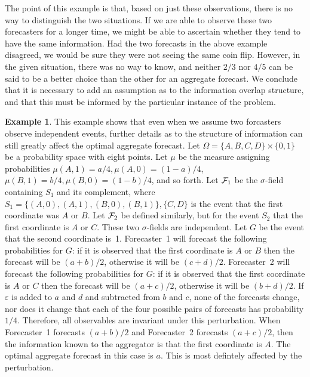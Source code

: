 \documentclass[11pt]{article}
\theoremstyle{definition}
\newtheorem{example}[theorem]{Example}
\theoremstyle{definition}
\def\F{{\cal F}}
\def\ee{\varepsilon}
\begin{document}
The point of this example is that, based on just these observations, 
there is no way to distinguish the two situations.  If we are able
to observe these two forecasters for a longer time, we might be
able to ascertain whether they tend to have the same information.
Had the two forecasts in the above example disagreed, we would be
sure they were not seeing the same coin flip.  However, in the given
situation, there was no way to know, and neither $2/3$ nor $4/5$ 
can be said to be a better choice than the other for an aggregate
forecast.  We conclude that it is necessary to add an assumption
as to the information overlap structure, and that this must be
informed by the particular instance of the problem.

\begin{example}
This example shows that even when we assume two forcasters observe
independent events, further details as to the structure of information
can still greatly affect the optimal aggregate forecast.  Let 
$\Omega = \{ A,B,C,D \} \times \{ 0,1 \}$ be a probability space 
with eight points.  Let $\mu$ be the measure assigning 
probabilities $\mu (A,1) = a/4, \mu (A,0) = (1-a)/4$, 
$\mu (B,1) = b/4, \mu (B,0) = (1-b)/4$, and so forth.
Let $\F_1$ be the $\sigma$-field containing $S_1$ and its complement, 
where $S_1 = \{ (A,0),(A,1),(B,0),(B,1) \}, \{C,D \}$ is the
event that the first coordinate was $A$ or $B$.  Let $\F_2$
be defined similarly, but for the event $S_2$ that the first coordinate
is $A$ or $C$.  These two $\sigma$-fields are independent.
Let $G$ be the event that the second coordinate is~1.
Forecaster~1 will forecast the following probabilities for $G$:
if it is observed that the first coordinate is $A$ or $B$ then
the forecast will be $(a+b)/2$, otherwise it will be $(c+d)/2$.
Forecaster~2 will forecast the following probabilities for $G$:
if it is observed that the first coordinate is $A$ or $C$ then
the forecast will be $(a+c)/2$, otherwise it will be $(b+d)/2$.
If $\ee$ is added to $a$ and $d$ and subtracted from $b$ and $c$,
none of the forecasts change, nor does it change that each of
the four possible pairs of forecasts has probability $1/4$.
Therefore, all observables are invariant under this perturbation.
When Forecaster~1 forecasts $(a+b)/2$ and Forecaster~2 forecasts
$(a+c)/2$, then the information known to the aggregator is that
the first coordinate is $A$.  The optimal aggregate forecast in
this case is $a$.  This is most defintely affected by the perturbation.  
\end{example}
\end{document}
